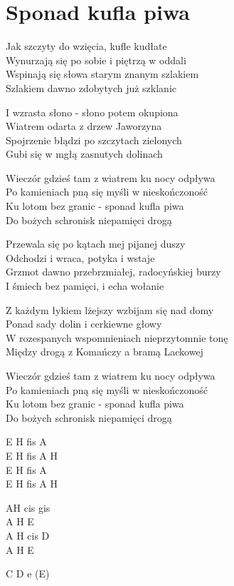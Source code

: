 \section{Sponad kufla piwa}
\begin{text}
Jak szczyty do wzięcia, kufle kudłate\\
Wynurzają się po sobie i piętrzą w oddali\\
Wspinają się słowa starym znanym szlakiem\\
Szlakiem dawno zdobytych już szklanic

I wzrasta słono - słono potem okupiona\\
Wiatrem odarta z drzew Jaworzyna\\
Spojrzenie błądzi po szczytach zielonych\\
Gubi się w mgłą zasnutych dolinach

\vin Wieczór gdzieś tam z wiatrem ku nocy odpływa\\
\vin Po kamieniach pną się myśli w nieskończoność\\
\vin Ku lotom bez granic - sponad kufla piwa\\
\vin Do bożych schronisk niepamięci drogą

Przewala się po kątach mej pijanej duszy\\
Odchodzi i wraca, potyka i wstaje\\
Grzmot dawno przebrzmiałej, radocyńskiej burzy\\
I śmiech bez pamięci, i echa wołanie

Z każdym łykiem lżejszy wzbijam się nad domy\\
Ponad sady dolin i cerkiewne głowy\\
W rozespanych wspomnieniach nieprzytomnie tonę\\
Między drogą z Komańczy a bramą Lackowej

\vin Wieczór gdzieś tam z wiatrem ku nocy odpływa\\
\vin Po kamieniach pną się myśli w nieskończoność\\
\vin Ku lotom bez granic - sponad kufla piwa\\
\vin Do bożych schronisk niepamięci drogą
\end{text}
\begin{chord}
    E H fis A\\
    E H fis A H\\
    E H fis A\\
    E H fis A H

    \hfill\break
    \hfill\break
    \hfill\break

    AH cis gis\\
    A H E\\
    A H cis D\\
    A H E

    \hfill\break
    \hfill\break
    \hfill\break
    \hfill\break

    \hfill\break
    \hfill\break
    \hfill\break
    \hfill\break

    \hfill\break
    C D e (E)
\end{chord}